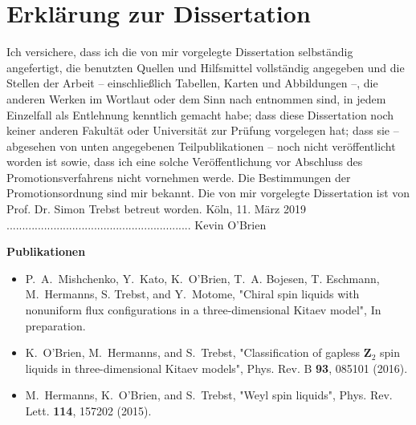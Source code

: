 \chapter*{Erkl\"{a}rung zur Dissertation}
\singlespacing
Ich versichere, dass ich die von mir vorgelegte Dissertation selbst\"{a}ndig angefertigt, die benutzten Quellen und Hilfsmittel vollst\"{a}ndig angegeben und die Stellen der Arbeit -- einschlie\ss lich Tabellen, Karten und Abbildungen --, die anderen Werken im Wortlaut oder dem Sinn nach entnommen sind, in jedem Einzelfall als Entlehnung kenntlich gemacht habe; dass diese Dissertation noch keiner anderen Fakult\"{a}t oder Universit\"{a}t zur Pr\"{u}fung vorgelegen hat; dass sie -- abgesehen von unten angegebenen Teilpublikationen -- noch nicht ver\"{o}ffentlicht worden ist sowie, dass ich eine solche Ver\"{o}ffentlichung vor Abschluss des Promotionsverfahrens nicht vornehmen werde. Die Bestimmungen der Promotionsordnung sind mir bekannt. Die von mir vorgelegte Dissertation ist von Prof. Dr. Simon Trebst betreut worden.
\vspace{2cm}\newline
K\"oln, 11. M\"{a}rz 2019
\hspace{3.2cm}
...........................................................\newline
{}
\hspace{3.2cm}
Kevin O'Brien


\vspace{2cm}
\noindent
{\huge\textbf{Publikationen}}
\newline
%
%
\begin{itemize}
	\item
		P.~A.~Mishchenko, Y.~Kato, K.~O'Brien, T.~A. Bojesen, T. Eschmann, M.~Hermanns, S. Trebst, and Y.~Motome, "Chiral spin liquids with nonuniform flux configurations in a three-dimensional Kitaev model", In preparation.
		
	\item
		K.~O'Brien, M.~Hermanns, and S.~Trebst, "Classification of gapless $\mathbf{Z}_2$ spin liquids in three-dimensional Kitaev models", Phys. Rev. B \textbf{93}, 085101 (2016).
		
	\item
		M.~Hermanns, K.~O'Brien, and S.~Trebst, "Weyl spin liquids", Phys. Rev. Lett. \textbf{114}, 157202 (2015).
\end{itemize}